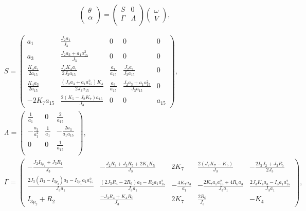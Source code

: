 \documentclass[10pt,a4paper]{amsart}
\begin{document}
\begin{equation}\label{coframe}
\begin{pmatrix}
\theta\\
\alpha\\
\end{pmatrix}=
\begin{pmatrix}
S&0\\
\Gamma&\Lambda\\
\end{pmatrix}
\begin{pmatrix}
\omega\\
V
\end{pmatrix},
\end{equation}

\begin{equation}\label{s3-10}
\begin{aligned}
&S=\begin{pmatrix}
a_1&\frac{J_2a_1}{J_3}&0&0&0\\
a_3&\frac{J_2a_3+a_1a_{15}^2}{J_3}&0&0&0\\
\frac{K_4a_1}{2a_{15}}&\frac{J_2K_4a_1}{2J_3a_{15}}&\frac{a_1}{a_{15}}&\frac{J_2a_1}{J_3a_{15}}&0\\
\frac{K_4a_3}{2a_{15}}&\frac{(J_2a_3+a_1a_{15}^2)K_4}{2J_3a_{15}}&\frac{a_3}{a_{15}}&\frac{J_2a_3+a_1a_{15}^2}{J_3a_{15}}&0\\
-2K_7a_{15}&\frac{2(K_5-J_2K_7)a_{15}}{J_3}&0&0&a_{15}
\end{pmatrix},\\
&\Lambda=\begin{pmatrix}
\frac{1}{a_1}&0&\frac{2}{a_{15}}\\
-\frac{a_3}{a_1^2}&\frac{1}{a_1}&-\frac{2a_3}{a_1a_{15}}\\
0&0&\frac{1}{a_{15}}\\
\end{pmatrix},\\
 &\Gamma=\begin{pmatrix}
-\frac{J_2I_{3p_1}+J_3R_1}{J_3}&-\frac{J_2R_3+J_3R_5+2K_4K_5}{J_3}&2K_7&\frac{2(J_2K_7-K_5)}{J_3}&-\frac{2I_3J_2+J_3R_7}{2J_3}\\
\frac{2J_3(R_3-I_{3p_2})a_3-I_{3p_1}a_1a_{15}^2}{J_3a_1}&\frac{(2J_3R_4-2R_6)a_3-R_2a_1a_{15}^2}{J_3a_1}&-\frac{4K_7a_3}{a_1}&-\frac{2K_7a_1a_{15}^2+4R_6a_3}{J_3a_1}&\frac{2J_3K_4a_3-I_3a_1a_{15}^2}{J_3a_1}\\
I_{3p_2}+R_{2}&\frac{-J_3R_4+K_4R_6}{J_3}&2K_7&\frac{2R_6}{J_3}&-K_4
\end{pmatrix},
\end{aligned}
\end{equation}
\end{document}

